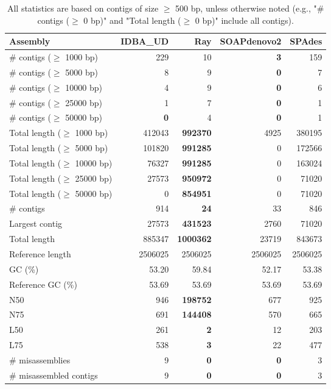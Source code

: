 \documentclass[12pt,a4paper]{article}
\begin{document}
\begin{table}[ht]
\begin{center}
\caption{All statistics are based on contigs of size $\geq$ 500 bp, unless otherwise noted (e.g., "\# contigs ($\geq$ 0 bp)" and "Total length ($\geq$ 0 bp)" include all contigs).}
\begin{tabular}{|l*{4}{|r}|}
\hline
Assembly & IDBA\_UD & Ray & SOAPdenovo2 & SPAdes \\ \hline
\# contigs ($\geq$ 1000 bp) & 229 & 10 & {\bf 3} & 159 \\ \hline
\# contigs ($\geq$ 5000 bp) & 8 & 9 & {\bf 0} & 7 \\ \hline
\# contigs ($\geq$ 10000 bp) & 4 & 9 & {\bf 0} & 6 \\ \hline
\# contigs ($\geq$ 25000 bp) & 1 & 7 & {\bf 0} & 1 \\ \hline
\# contigs ($\geq$ 50000 bp) & {\bf 0} & 4 & {\bf 0} & 1 \\ \hline
Total length ($\geq$ 1000 bp) & 412043 & {\bf 992370} & 4925 & 380195 \\ \hline
Total length ($\geq$ 5000 bp) & 101820 & {\bf 991285} & 0 & 172566 \\ \hline
Total length ($\geq$ 10000 bp) & 76327 & {\bf 991285} & 0 & 163024 \\ \hline
Total length ($\geq$ 25000 bp) & 27573 & {\bf 950972} & 0 & 71020 \\ \hline
Total length ($\geq$ 50000 bp) & 0 & {\bf 854951} & 0 & 71020 \\ \hline
\# contigs & 914 & {\bf 24} & 33 & 846 \\ \hline
Largest contig & 27573 & {\bf 431523} & 2760 & 71020 \\ \hline
Total length & 885347 & {\bf 1000362} & 23719 & 843673 \\ \hline
Reference length & 2506025 & 2506025 & 2506025 & 2506025 \\ \hline
GC (\%) & 53.20 & 59.84 & 52.17 & 53.38 \\ \hline
Reference GC (\%) & 53.69 & 53.69 & 53.69 & 53.69 \\ \hline
N50 & 946 & {\bf 198752} & 677 & 925 \\ \hline
N75 & 691 & {\bf 144408} & 570 & 665 \\ \hline
L50 & 261 & {\bf 2} & 12 & 203 \\ \hline
L75 & 538 & {\bf 3} & 22 & 477 \\ \hline
\# misassemblies & 9 & {\bf 0} & {\bf 0} & 3 \\ \hline
\# misassembled contigs & 9 & {\bf 0} & {\bf 0} & 3 \\ \hline

\end{tabular}
\end{center}
\end{table}
\end{document}
